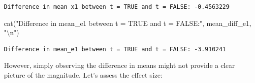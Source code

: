 \documentclass[
  letterpaper,
  DIV=11,
  numbers=noendperiod]{scrreprt}
\newenvironment{Shaded}{\begin{snugshade}}{\end{snugshade}}
\newcommand{\AttributeTok}[1]{\textcolor[rgb]{0.40,0.45,0.13}{#1}}
\newcommand{\CommentTok}[1]{\textcolor[rgb]{0.37,0.37,0.37}{#1}}
\newcommand{\DecValTok}[1]{\textcolor[rgb]{0.68,0.00,0.00}{#1}}
\newcommand{\FunctionTok}[1]{\textcolor[rgb]{0.28,0.35,0.67}{#1}}
\newcommand{\NormalTok}[1]{\textcolor[rgb]{0.00,0.23,0.31}{#1}}
\newcommand{\OtherTok}[1]{\textcolor[rgb]{0.00,0.23,0.31}{#1}}
\newcommand{\SpecialCharTok}[1]{\textcolor[rgb]{0.37,0.37,0.37}{#1}}
\newcommand{\StringTok}[1]{\textcolor[rgb]{0.13,0.47,0.30}{#1}}
\begin{document}
\begin{Shaded}
\end{Shaded}

\begin{verbatim}
Difference in mean_x1 between t = TRUE and t = FALSE: -0.4563229 
\end{verbatim}

\begin{Shaded}
\begin{Highlighting}[]
\FunctionTok{cat}\NormalTok{(}\StringTok{"Difference in mean\_e1 between t = TRUE and t = FALSE:"}\NormalTok{, mean\_diff\_e1, }\StringTok{"}\SpecialCharTok{\textbackslash{}n}\StringTok{"}\NormalTok{)}
\end{Highlighting}
\end{Shaded}

\begin{verbatim}
Difference in mean_e1 between t = TRUE and t = FALSE: -3.910241 
\end{verbatim}

However, simply observing the difference in means might not provide a
clear picture of the magnitude. Let's assess the effect size:
\end{document}
